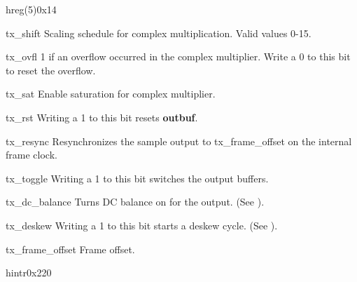 \documentclass[12pt,a4paper,parskip=full,abstract=true,BCOR=12mm,twoside,open=right]{scrreprt}
\def\module#1{{\ttfamily\bfseries #1}}
\begin{document}
\begin{register}{h}{reg(5)}{0x14}%
    \label{reg5}%
    \regnewline%
    \begin{regdesc}\begin{reglist}
        \item[tx\_shift] Scaling schedule for complex multiplication. Valid values 0-15.
        \item[tx\_ovfl] 1 if an overflow occurred in the complex multiplier.
            Write a 0 to this bit to reset the overflow.
        \item[tx\_sat] Enable saturation for complex multiplier.
        \item[tx\_rst] Writing a 1 to this bit resets \module{outbuf}.
        \item[tx\_resync] Resynchronizes the sample output to
            tx\_frame\_offset on the internal frame clock.
        \item[tx\_toggle] Writing a 1 to this bit switches the output buffers.
        \item[tx\_dc\_balance] Turns DC balance on for the output. (See
            \cite{ds90cr485}).
        \item[tx\_deskew] Writing a 1 to this bit starts a deskew cycle. (See
            \cite{ds90cr485}).
        \item[tx\_frame\_offset] Frame offset.
    \end{reglist}\end{regdesc}
\end{register}
\begin{register}{h}{intr}{0x220}%
    \label{intr}%
    \regnewline%
\end{register}
\FloatBarrier %
\end{document}
